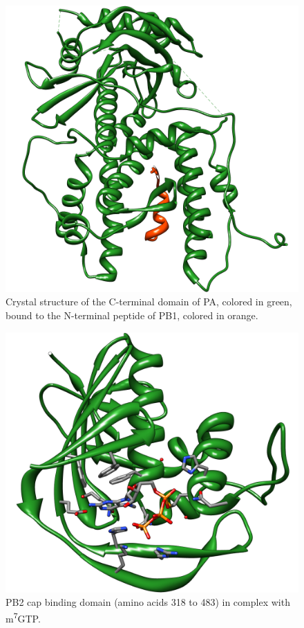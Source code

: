 \begin{figure}
\centering
\includegraphics[width=\linewidth]{../influenza/2ZNL.png}
\caption{Crystal structure of the C-terminal domain of PA, colored in green, bound to the N-terminal peptide of PB1, colored in orange.}
\label{Case:2ZNL}
\end{figure}

\begin{figure}
\centering
\includegraphics[width=\linewidth]{../influenza/2VQZ.png}
\caption{PB2 cap binding domain (amino acids 318 to 483) in complex with m\textsuperscript{7}GTP.}
\label{Case:2VQZ}
\end{figure}

